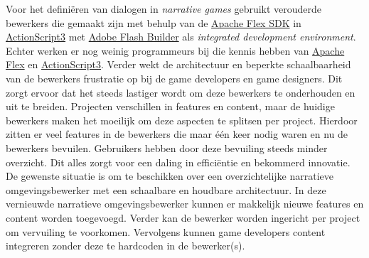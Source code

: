 Voor het definiëren van dialogen in \emph{narrative games} gebruikt \organisation{} verouderde bewerkers die gemaakt zijn met behulp van de \href{https://en.wikipedia.org/wiki/Apache_Flex}{Apache Flex SDK} in \href{http://www.adobe.com/devnet/actionscript/articles/actionscript3_overview.html}{ActionScript3} met \href{https://en.wikipedia.org/wiki/Adobe_Flash_Builder}{Adobe Flash Builder} als \emph{integrated development environment}.
Echter werken er nog weinig programmeurs bij \organisation die kennis hebben van \href{https://en.wikipedia.org/wiki/Apache_Flex}{Apache Flex} en \href{http://www.adobe.com/devnet/actionscript/articles/actionscript3_overview.html}{ActionScript3}.
Verder wekt de architectuur en beperkte schaalbaarheid van de bewerkers frustratie op bij de game developers en game designers.
Dit zorgt ervoor dat het steeds lastiger wordt om deze bewerkers te onderhouden en uit te breiden.
Projecten verschillen in features en content, maar de huidige bewerkers maken het moeilijk om deze aspecten te splitsen per project.
Hierdoor zitten er veel features in de bewerkers die maar één keer nodig waren en nu de bewerkers bevuilen.
Gebruikers hebben door deze bevuiling steeds minder overzicht.
Dit alles zorgt voor een daling in efficiëntie en bekommerd innovatie.
De gewenste situatie is om te beschikken over een overzichtelijke narratieve omgevingsbewerker met een schaalbare en houdbare architectuur.
In deze vernieuwde narratieve omgevingsbewerker kunnen er makkelijk nieuwe features en content worden toegevoegd.
Verder kan de bewerker worden ingericht per project om vervuiling te voorkomen.
Vervolgens kunnen game developers content integreren zonder deze te hardcoden in de bewerker(s).

